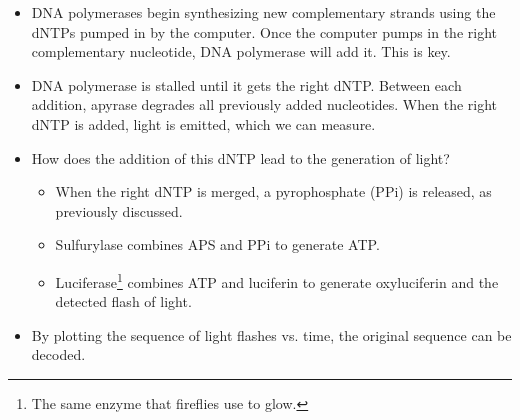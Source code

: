 \documentclass[../notes.tex]{subfiles}
\begin{document}
\begin{itemize}
\begin{itemize}
        \item DNA polymerases begin synthesizing new complementary strands using the dNTPs pumped in by the computer. Once the computer pumps in the right complementary nucleotide, DNA polymerase will add it. This is key.
        \item DNA polymerase is stalled until it gets the right dNTP. Between each addition, apyrase degrades all previously added nucleotides. When the right dNTP is added, light is emitted, which we can measure.
        \item How does the addition of this dNTP lead to the generation of light?
        \begin{itemize}
            \item When the right dNTP is merged, a pyrophosphate (PPi) is released, as previously discussed.
            \item Sulfurylase combines APS and PPi to generate ATP.
            \item Luciferase\footnote{The same enzyme that fireflies use to glow.} combines ATP and luciferin to generate oxyluciferin and the detected flash of light.
        \end{itemize}
        \item By plotting the sequence of light flashes vs. time, the original sequence can be decoded.
    \end{itemize}
\end{itemize}
\end{document}
